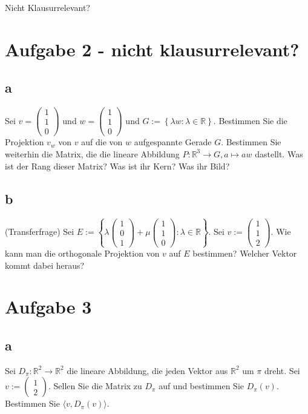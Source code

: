 Nicht Klausurrelevant?

\section{Aufgabe 2 - nicht klausurrelevant?}

\subsection{a}
Sei $v = \begin{pmatrix}
        1 \\ 1 \\ 0
    \end{pmatrix}$ und $w = \begin{pmatrix}
        1 \\ 1 \\ 0
    \end{pmatrix}$ und $G := \left\{\lambda w: \lambda \in \mathbb{R}\right\}$. Bestimmen Sie die Projektion $v_w$ von
$v$ auf die von $w$ aufgespannte Gerade $G$.
Bestimmen Sie weiterhin die Matrix, die die lineare Abbildung $P: \mathbb{R}^3 \rightarrow G, a \mapsto aw$ dastellt.
Was ist der Rang dieser Matrix? Was ist ihr Kern? Was ihr Bild?

\subsection{b}
(Transferfrage) Sei $E := \left\{\lambda\begin{pmatrix}
        1 \\ 0 \\ 1
    \end{pmatrix} + \mu \begin{pmatrix}
        1 \\ 1 \\ 0
    \end{pmatrix}: \lambda \in \mathbb{R}\right\}$. Sei $v := \begin{pmatrix}
        1 \\ 1 \\ 2
    \end{pmatrix}$. Wie kann man die orthogonale Projektion von $v$ auf $E$ bestimmen? Welcher Vektor kommt dabei heraus?

\section{Aufgabe 3}

\subsection{a}
Sei $D_\pi: \mathbb{R}^2 \rightarrow \mathbb{R}^2$ die lineare Abbildung, die
jeden Vektor aus $\mathbb{R}^2$ um $\pi$ dreht. Sei $v := \begin{pmatrix}1 \\2\end{pmatrix}$. Sellen Sie die Matrix zu $D_\pi$ auf und bestimmen Sie
$D_\pi(v)$. Bestimmen Sie $\langle v, D_\pi(v)\rangle$.

